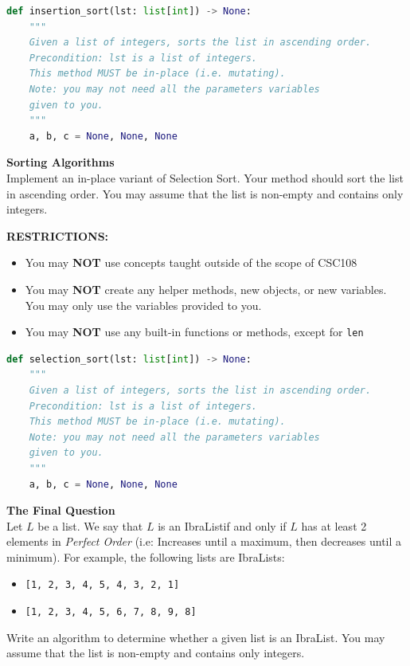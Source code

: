 \documentclass[letterpaper,13pt,addpoints]{exam}
\begin{document}
\begin{questions}
\begin{lstlisting}[language=Python, style=mystyle]
def insertion_sort(lst: list[int]) -> None:
    """
    Given a list of integers, sorts the list in ascending order.
    Precondition: lst is a list of integers.
    This method MUST be in-place (i.e. mutating).
    Note: you may not need all the parameters variables
    given to you.
    """
    a, b, c = None, None, None
    \end{lstlisting}
\clearpage
\question[10] \textbf{Sorting Algorithms} \\
Implement an in-place variant of Selection Sort. Your method should sort the list in ascending order. You may assume that the list is non-empty and contains only integers.
\begin{center}
    \textbf{RESTRICTIONS:}
    \begin{itemize}
        \item You may \textbf{NOT} use concepts taught outside of the scope of CSC108
        \item You may \textbf{NOT} create any helper methods, new objects, or new variables.
              You may only use the variables provided to you.
        \item You may \textbf{NOT} use any built-in functions or methods, except for
              \texttt{len}
    \end{itemize}
\end{center}
\begin{lstlisting}[language=Python, style=mystyle]
def selection_sort(lst: list[int]) -> None:
    """
    Given a list of integers, sorts the list in ascending order.
    Precondition: lst is a list of integers.
    This method MUST be in-place (i.e. mutating).
    Note: you may not need all the parameters variables
    given to you.
    """
    a, b, c = None, None, None
\end{lstlisting}
\clearpage
\question[10] \textbf{The Final Question} \\
Let $L$ be a list. We say that $L$ is an IbraList\texttrademark if and only if $L$ has at least 2 elements in \textit{Perfect Order} (i.e: Increases until a maximum, then decreases until a minimum). For example, the following lists are IbraLists:
\begin{itemize}
    \item \texttt{[1, 2, 3, 4, 5, 4, 3, 2, 1]}
    \item \texttt{[1, 2, 3, 4, 5, 6, 7, 8, 9, 8]}
\end{itemize}
Write an algorithm to determine whether a given list is an IbraList\texttrademark. You may assume that the list is non-empty and contains only integers.

\end{questions}
\end{document}
